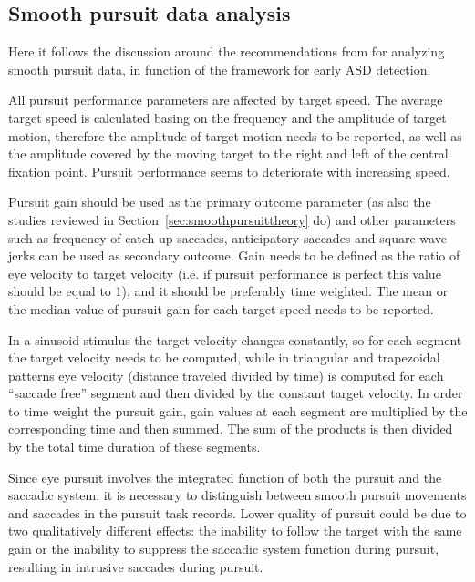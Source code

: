 \subsection{Smooth pursuit data analysis}
\label{sec:fwksmoothpursuitanalysis}

Here it follows the discussion around the recommendations from \cite{smyrnis2008guidelines} for analyzing smooth pursuit data, in function of the framework for early ASD detection.

All pursuit performance parameters are affected by target speed. The average target speed is calculated basing on the frequency and the amplitude of target motion, therefore the amplitude of target motion needs to be reported, as well as the amplitude covered by the moving target to the right and left of the central fixation point. Pursuit performance seems to deteriorate with increasing speed.

Pursuit gain should be used as the primary outcome parameter (as also the studies reviewed in Section~\ref{sec:smoothpursuittheory} do) and other parameters such as frequency of catch up saccades, anticipatory saccades and square wave jerks can be used as secondary outcome. Gain needs to be defined as the ratio of eye velocity to target velocity (i.e. if pursuit performance is perfect this value should be equal to 1), and it should be preferably time weighted. The mean or the median value of pursuit gain for each target speed needs to be reported.

In a sinusoid stimulus the target velocity changes constantly, so for each segment the target velocity needs to be computed, while in triangular and trapezoidal patterns eye velocity (distance traveled divided by time) is computed for each “saccade free” segment and then divided by the constant target velocity. In order to time weight the pursuit gain, gain values at each segment are multiplied by the corresponding time and then summed. The sum of the products is then divided by the total time duration of these segments.

Since eye pursuit involves the integrated function of both the pursuit and the saccadic system, it is necessary to distinguish between smooth pursuit movements and saccades in the pursuit task records. Lower quality of pursuit could be due to two qualitatively different effects: the inability to follow the target with the same gain or the inability to suppress the saccadic system function during pursuit, resulting in intrusive saccades during pursuit.


